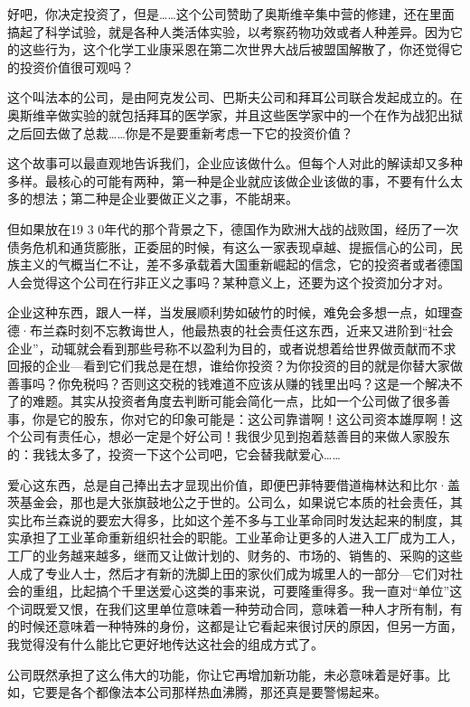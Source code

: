 好吧，你决定投资了，但是\ldots{}\ldots{}这个公司赞助了奥斯维辛集中营的修建，还在里面搞起了科学试验，就是各种人类活体实验，以考察药物功效或者人种差异。因为它的这些行为，这个化学工业康采恩在第二次世界大战后被盟国解散了，你还觉得它的投资价值很可观吗？

这个叫法本的公司，是由阿克发公司、巴斯夫公司和拜耳公司联合发起成立的。在奥斯维辛做实验的就包括拜耳的医学家，并且这些医学家中的一个在作为战犯出狱之后回去做了总裁\ldots{}\ldots{}你是不是要重新考虑一下它的投资价值？

这个故事可以最直观地告诉我们，企业应该做什么。但每个人对此的解读却又多种多样。最核心的可能有两种，第一种是企业就应该做企业该做的事，不要有什么太多的想法；第二种是企业要做正义之事，不能胡来。

但如果放在19 3
0年代的那个背景之下，德国作为欧洲大战的战败国，经历了一次债务危机和通货膨胀，正委屈的时候，有这么一家表现卓越、提振信心的公司，民族主义的气概当仁不让，差不多承载着大国重新崛起的信念，它的投资者或者德国人会觉得这个公司在行非正义之事吗？某种意义上，还要为这个投资加分才对。

企业这种东西，跟人一样，当发展顺利势如破竹的时候，难免会多想一点，如理查德·布兰森时刻不忘教诲世人，他最热衷的社会责任这东西，近来又进阶到``社会企业''，动辄就会看到那些号称不以盈利为目的，或者说想着给世界做贡献而不求回报的企业---看到它们我总是在想，谁给你投资？为你投资的目的就是你替大家做善事吗？你免税吗？否则这交税的钱难道不应该从赚的钱里出吗？这是一个解决不了的难题。其实从投资者角度去判断可能会简化一点，比如一个公司做了很多善事，你是它的股东，你对它的印象可能是：这公司靠谱啊！这公司资本雄厚啊！这个公司有责任心，想必一定是个好公司！我很少见到抱着慈善目的来做人家股东的：我钱太多了，投资一下这个公司吧，它会替我献爱心\ldots{}\ldots{}

爱心这东西，总是自己捧出去才显现出价值，即便巴菲特要借道梅林达和比尔·盖茨基金会，那也是大张旗鼓地公之于世的。公司么，如果说它本质的社会责任，其实比布兰森说的要宏大得多，比如这个差不多与工业革命同时发达起来的制度，其实承担了工业革命重新组织社会的职能。工业革命让更多的人进入工厂成为工人，工厂的业务越来越多，继而又让做计划的、财务的、市场的、销售的、采购的这些人成了专业人士，然后才有新的洗脚上田的家伙们成为城里人的一部分---它们对社会的重组，比起搞个千里送爱心这类的事来说，可要隆重得多。我一直对``单位''这个词既爱又恨，在我们这里单位意味着一种劳动合同，意味着一种人才所有制，有的时候还意味着一种特殊的身份，这都是让它看起来很讨厌的原因，但另一方面，我觉得没有什么能比它更好地传达这社会的组成方式了。

公司既然承担了这么伟大的功能，你让它再增加新功能，未必意味着是好事。比如，它要是各个都像法本公司那样热血沸腾，那还真是要警惕起来。

